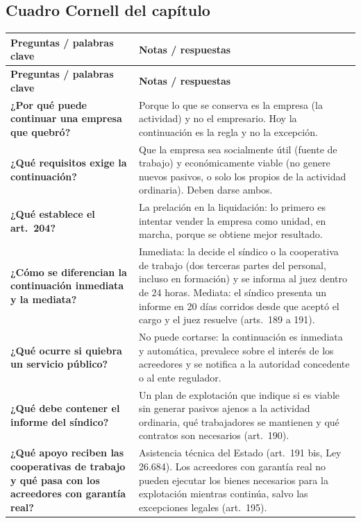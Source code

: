 \documentclass[12pt,oneside]{book}
\begin{document}
\subsection*{Cuadro Cornell del capítulo}

\begin{longtable}{>{\raggedright\arraybackslash}p{} >{\raggedright\arraybackslash}p{}}
\toprule
\textbf{Preguntas / palabras clave} & \textbf{Notas / respuestas} \\
\midrule
\endfirsthead
\toprule
\textbf{Preguntas / palabras clave} & \textbf{Notas / respuestas} \\
\midrule
\endhead
\textbf{¿Por qué puede continuar una empresa que quebró?} & Porque lo que se conserva es la empresa (la actividad) y no el empresario. Hoy la continuación es la regla y no la excepción. \\[0.6em]
\textbf{¿Qué requisitos exige la continuación?} & Que la empresa sea socialmente útil (fuente de trabajo) y económicamente viable (no genere nuevos pasivos, o solo los propios de la actividad ordinaria). Deben darse ambos. \\[0.6em]
\textbf{¿Qué establece el art.~204?} & La prelación en la liquidación: lo primero es intentar vender la empresa como unidad, en marcha, porque se obtiene mejor resultado. \\[0.6em]
\textbf{¿Cómo se diferencian la continuación inmediata y la mediata?} & Inmediata: la decide el síndico o la cooperativa de trabajo (dos terceras partes del personal, incluso en formación) y se informa al juez dentro de 24 horas. Mediata: el síndico presenta un informe en 20 días corridos desde que aceptó el cargo y el juez resuelve (arts.~189 a 191). \\[0.6em]
\textbf{¿Qué ocurre si quiebra un servicio público?} & No puede cortarse: la continuación es inmediata y automática, prevalece sobre el interés de los acreedores y se notifica a la autoridad concedente o al ente regulador. \\[0.6em]
\textbf{¿Qué debe contener el informe del síndico?} & Un plan de explotación que indique si es viable sin generar pasivos ajenos a la actividad ordinaria, qué trabajadores se mantienen y qué contratos son necesarios (art.~190). \\[0.6em]
\textbf{¿Qué apoyo reciben las cooperativas de trabajo y qué pasa con los acreedores con garantía real?} & Asistencia técnica del Estado (art.~191 bis, Ley 26.684). Los acreedores con garantía real no pueden ejecutar los bienes necesarios para la explotación mientras continúa, salvo las excepciones legales (art.~195). \\

\end{longtable}
\end{document}
